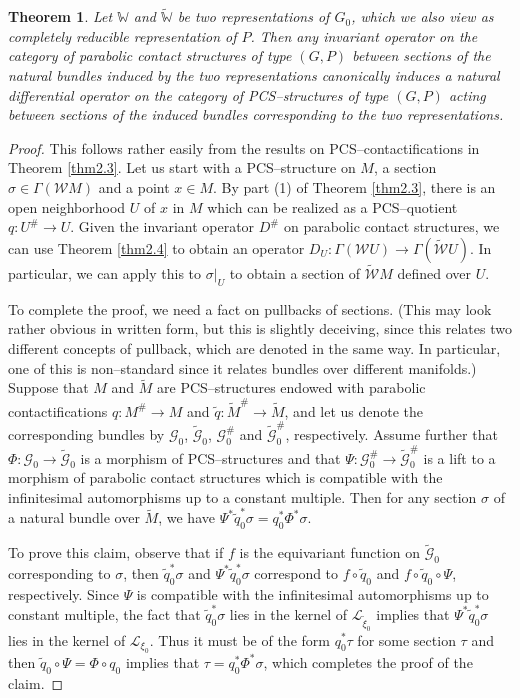 \documentclass[12pt,a4paper]{amsart}
\def\Bbb{\mathbb}
\def\Cal{\mathcal}
\renewcommand{\o}{\circ}
\newcommand{\si}{\sigma}
\newcommand{\Ga}{\Gamma}
\newcommand{\Ph}{\Phi}
\newcommand{\Ps}{\Psi}
\newcommand{\tcg}{{\tilde{\Cal G}}}
\newcommand{\tcw}{{\tilde{\Cal W}}}
\newcommand{\tbw}{{\tilde{\Bbb W}}}
\newcounter{theorem}
\numberwithin{theorem}{section}
\newtheorem{thm}[theorem]{Theorem}
\theoremstyle{definition}
\theoremstyle{remark}
\begin{document}
\begin{thm}\label{thm2.5}
Let $\Bbb W$ and $\tbw$ be two representations of $G_0$, which we also
view as completely reducible representation of $P$. Then any invariant
operator on the category of parabolic contact structures of type
$(G,P)$ between sections of the natural bundles induced by the two
representations canonically induces a natural differential operator on
the category of PCS--structures of type $(G,P)$ acting between
sections of the induced bundles corresponding to the two
representations. 
\end{thm}
\begin{proof}
This follows rather easily from the results on PCS--contactifications
in Theorem \ref{thm2.3}. Let us start with a PCS--structure on $M$, a
section $\si\in\Ga(\Cal WM)$ and a point $x\in M$. By part (1) of
Theorem \ref{thm2.3}, there is an open neighborhood $U$ of $x$ in $M$
which can be realized as a PCS--quotient $q:U^\#\to U$. Given the
invariant operator $D^\#$ on parabolic contact structures, we can use
Theorem \ref{thm2.4} to obtain an operator $D_U:\Ga(\Cal WU)\to \Ga(\tcw
U)$. In particular, we can apply this to $\si|_U$ to obtain a section
of $\tcw M$ defined over $U$.

To complete the proof, we need a fact on pullbacks of sections. (This
may look rather obvious in written form, but this is slightly
deceiving, since this relates two different concepts of pullback,
which are denoted in the same way. In particular, one of this is
non--standard since it relates bundles over different manifolds.)
Suppose that $M$ and $\tilde M$ are PCS--structures endowed with
parabolic contactifications $q:M^\#\to M$ and $\tilde q:\tilde
M^\#\to\tilde M$, and let us denote the corresponding bundles by $\Cal
G_0$, $\tcg_0$, $\Cal G_0^\#$ and $\tcg_0^\#$, respectively. Assume
further that $\Ph:\Cal G_0\to\tcg_0$ is a morphism of PCS--structures
and that $\Ps:\Cal G_0^\#\to\tcg_0^\#$ is a lift to a morphism of
parabolic contact structures which is compatible with the
infinitesimal automorphisms up to a constant multiple. Then for any
section $\si$ of a natural bundle over $\tilde M$, we have
$\Ps^*\tilde q^*_0\si=q^*_0\Ph^*\si$.

To prove this claim, observe that if $f$ is the equivariant function on
$\tcg_0$ corresponding to $\si$, then $\tilde q^*_0\si$ and $\Ps^*\tilde
q^*_0\si$ correspond to $f\o\tilde q_0$ and $f\o\tilde q_0\o\Ps$,
respectively. Since $\Ps$ is compatible with the infinitesimal
automorphisms up to constant multiple, the fact that $\tilde q^*_0\si$
lies in the kernel of $\Cal L_{\tilde\xi_0}$ implies that $\Ps^*\tilde
q^*_0\si$ lies in the kernel of $\Cal L_{\xi_0}$.  Thus it must be of the
form $q^*_0\tau$ for some section $\tau$ and then $\tilde
q_0\o\Ps=\Ph\o q_0$ implies that $\tau=q^*_0\Ph^*\si$, which completes
the proof of the claim. 


\end{proof}
\end{document}
